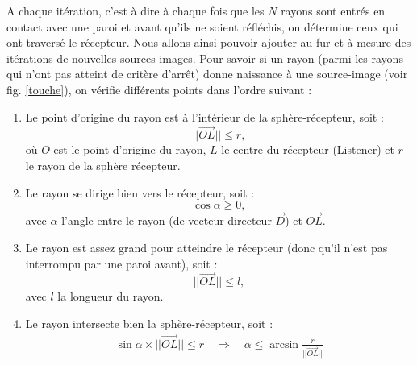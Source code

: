 A chaque itération, c'est à dire à chaque fois que les $N$ rayons sont entrés en contact avec une paroi et avant qu'ils ne soient réfléchis, on détermine ceux qui ont traversé le récepteur. Nous allons ainsi pouvoir ajouter au fur et à mesure des itérations de nouvelles sources-images. Pour savoir si un rayon (parmi les rayons qui n'ont pas atteint de critère d'arrêt) donne naissance à une source-image (voir fig. \ref{touche}), on vérifie différents points dans l'ordre suivant :

\begin{enumerate}
\item Le point d'origine du rayon est à l'intérieur de la sphère-récepteur, soit :
	\begin{equation}
		||\overrightarrow{OL}|| \leqslant r,
	\end{equation}
où $O$ est le point d'origine du rayon, $L$ le centre du récepteur (Listener) et $r$ le rayon de la sphère récepteur.
\item Le rayon se dirige bien vers le récepteur, soit :
	\begin{equation}
		\cos{\alpha} \geqslant 0,
	\end{equation}
avec $\alpha$ l'angle entre le rayon (de vecteur directeur $\overrightarrow{D}$) et $\overrightarrow{OL}$.
\item Le rayon est assez grand pour atteindre le récepteur (donc qu'il n'est pas interrompu par une paroi avant), soit :
%
\begin{equation}
||\overrightarrow{OL}|| \leqslant l,
\end{equation}
%
avec $l$ la longueur du rayon.
\item Le rayon intersecte bien la sphère-récepteur, soit :
%
\begin{align}
\sin{\alpha} \times ||\overrightarrow{OL}||  \leqslant r 
\quad \Rightarrow \quad
\alpha  \leqslant \arcsin{\frac{r}{||\overrightarrow{OL}||}}
\end{align}
%
\end{enumerate}
%
%
